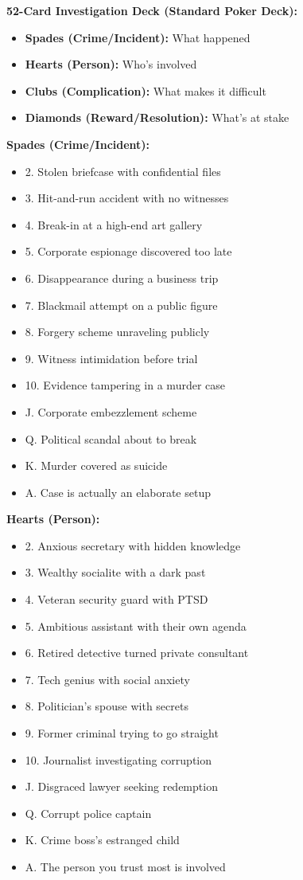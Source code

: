\documentclass[11pt]{article}
\begin{document}
\textbf{52-Card Investigation Deck (Standard Poker Deck):}
\begin{itemize}
    \item \textbf{Spades (Crime/Incident):} What happened
    \item \textbf{Hearts (Person):} Who's involved
    \item \textbf{Clubs (Complication):} What makes it difficult
    \item \textbf{Diamonds (Reward/Resolution):} What's at stake
\end{itemize}

\textbf{Spades (Crime/Incident):}
\begin{itemize}
    \item 2. Stolen briefcase with confidential files
    \item 3. Hit-and-run accident with no witnesses
    \item 4. Break-in at a high-end art gallery
    \item 5. Corporate espionage discovered too late
    \item 6. Disappearance during a business trip
    \item 7. Blackmail attempt on a public figure
    \item 8. Forgery scheme unraveling publicly
    \item 9. Witness intimidation before trial
    \item 10. Evidence tampering in a murder case
    \item J. Corporate embezzlement scheme
    \item Q. Political scandal about to break
    \item K. Murder covered as suicide
    \item A. Case is actually an elaborate setup
\end{itemize}

\textbf{Hearts (Person):}
\begin{itemize}
    \item 2. Anxious secretary with hidden knowledge
    \item 3. Wealthy socialite with a dark past
    \item 4. Veteran security guard with PTSD
    \item 5. Ambitious assistant with their own agenda
    \item 6. Retired detective turned private consultant
    \item 7. Tech genius with social anxiety
    \item 8. Politician's spouse with secrets
    \item 9. Former criminal trying to go straight
    \item 10. Journalist investigating corruption
    \item J. Disgraced lawyer seeking redemption
    \item Q. Corrupt police captain
    \item K. Crime boss's estranged child
    \item A. The person you trust most is involved
\end{itemize}
\end{document}

